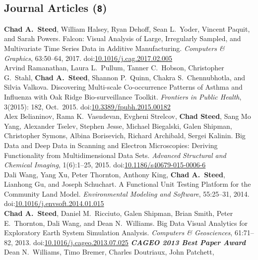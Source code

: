 \documentclass[11pt, letterpaper]{article}
\newcommand{\amper}{{\fontspec[Scale=.95]{Hoefler Text}\selectfont\itshape\&}}
\newcommand{\years}[1]{\marginnote{\scriptsize #1}}
\begin{document}
\subsection*{Journal Articles (\texttt{8})}
\begin{sloppypar}
\noindent\years{2017}\textbf{Chad A.\ Steed}, William Halsey, Ryan Dehoff,
Sean L.\ Yoder, Vincent Paquit, and Sarah Powers.  Falcon: Visual Analysis of Large, Irregularly Sampled, and Multivariate Time Series Data in Additive Manufacturing. \emph{Computers \& Graphics}, 63:50--64, 2017. doi:\href{http://dx.doi.org/10.1016/j.cag.2017.02.005}
{10.1016/j.cag.2017.02.005}\\
\years{2015}Arvind Ramanathan, Laura L.\ Pullum, Tanner C.\ Hobson,
Christopher G.\ Stahl, \textbf{Chad A.\ Steed}, Shannon P.\ Quinn,
Chakra S.\ Chennubhotla, and Silvia Valkova.  Discovering Multi-scale
Co-occurrence Patterns of Asthma and Influenza with Oak Ridge Bio-surveillance
Toolkit. \emph{Frontiers in Public Health}, 3(2015): 182, Oct.\ 2015.
doi:\href{http://dx.doi.org/10.3389/fpubh.2015.00182}
{10.3389/fpubh.2015.00182}\\
\years{2015}Alex Belianinov, Rama K.\ Vasudevan, Evgheni Strelcov,
\textbf{Chad Steed}, Sang Mo Yang, Alexander Tselev, Stephen Jesse,
Michael Biegalski, Galen Shipman, Christopher Symons, Albina Borisevich,
Richard Archibald, Sergei Kalinin.  Big Data and Deep Data in Scanning
and Electron Microscopies: Deriving Functionality from Multidimensional Data
Sets. \emph{Advanced Structural and Chemical Imaging}, 1(6):1--25, 2015.
doi:\href{http://dx.doi.org/10.1186/s40679-015-0006-6}
{10.1186/s40679-015-0006-6}\\
\years{2014}Dali Wang, Yang Xu, Peter Thornton, Anthony King,
\textbf{Chad A.\ Steed}, Lianhong Gu, and Joseph Schuchart.
A Functional Unit Testing Platform for the Community Land Model.
\emph{Environmental Modeling and Software}, 55:25--31, 2014.
doi:\href{http://dx.doi.org/10.1016/j.envsoft.2014.01.015}
{10.1016/j.envsoft.2014.01.015}\\
\years{2013}\textbf{Chad A.\ Steed}, Daniel M.\ Ricciuto, Galen Shipman,
Brian Smith, Peter E.\ Thornton, Dali Wang, and Dean N.\ Williams.
Big Data Visual Analytics for Exploratory Earth System Simulation Analysis.
\emph{Computers \amper{} Geosciences}, 61:71--82, 2013.
doi:\href{http://dx.doi.org/10.1016/j.cageo.2013.07.025}
{10.1016/j.cageo.2013.07.025}
\textbf{\emph{CAGEO 2013 Best Paper Award}}\\
\years{2013}Dean N.\ Williams, Timo Bremer, Charles Doutriaux, John Patchett,

\end{sloppypar}
\end{document}

